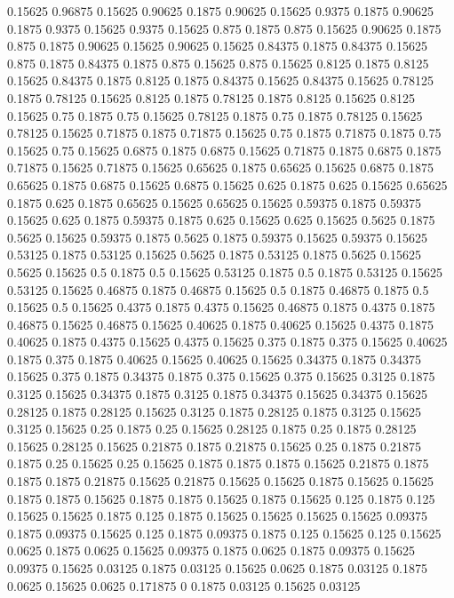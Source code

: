 0.15625 0.96875
0.15625 0.90625
0.1875 0.90625
0.15625 0.9375
0.1875 0.90625
0.1875 0.9375
0.15625 0.9375
0.15625 0.875
0.1875 0.875
0.15625 0.90625
0.1875 0.875
0.1875 0.90625
0.15625 0.90625
0.15625 0.84375
0.1875 0.84375
0.15625 0.875
0.1875 0.84375
0.1875 0.875
0.15625 0.875
0.15625 0.8125
0.1875 0.8125
0.15625 0.84375
0.1875 0.8125
0.1875 0.84375
0.15625 0.84375
0.15625 0.78125
0.1875 0.78125
0.15625 0.8125
0.1875 0.78125
0.1875 0.8125
0.15625 0.8125
0.15625 0.75
0.1875 0.75
0.15625 0.78125
0.1875 0.75
0.1875 0.78125
0.15625 0.78125
0.15625 0.71875
0.1875 0.71875
0.15625 0.75
0.1875 0.71875
0.1875 0.75
0.15625 0.75
0.15625 0.6875
0.1875 0.6875
0.15625 0.71875
0.1875 0.6875
0.1875 0.71875
0.15625 0.71875
0.15625 0.65625
0.1875 0.65625
0.15625 0.6875
0.1875 0.65625
0.1875 0.6875
0.15625 0.6875
0.15625 0.625
0.1875 0.625
0.15625 0.65625
0.1875 0.625
0.1875 0.65625
0.15625 0.65625
0.15625 0.59375
0.1875 0.59375
0.15625 0.625
0.1875 0.59375
0.1875 0.625
0.15625 0.625
0.15625 0.5625
0.1875 0.5625
0.15625 0.59375
0.1875 0.5625
0.1875 0.59375
0.15625 0.59375
0.15625 0.53125
0.1875 0.53125
0.15625 0.5625
0.1875 0.53125
0.1875 0.5625
0.15625 0.5625
0.15625 0.5
0.1875 0.5
0.15625 0.53125
0.1875 0.5
0.1875 0.53125
0.15625 0.53125
0.15625 0.46875
0.1875 0.46875
0.15625 0.5
0.1875 0.46875
0.1875 0.5
0.15625 0.5
0.15625 0.4375
0.1875 0.4375
0.15625 0.46875
0.1875 0.4375
0.1875 0.46875
0.15625 0.46875
0.15625 0.40625
0.1875 0.40625
0.15625 0.4375
0.1875 0.40625
0.1875 0.4375
0.15625 0.4375
0.15625 0.375
0.1875 0.375
0.15625 0.40625
0.1875 0.375
0.1875 0.40625
0.15625 0.40625
0.15625 0.34375
0.1875 0.34375
0.15625 0.375
0.1875 0.34375
0.1875 0.375
0.15625 0.375
0.15625 0.3125
0.1875 0.3125
0.15625 0.34375
0.1875 0.3125
0.1875 0.34375
0.15625 0.34375
0.15625 0.28125
0.1875 0.28125
0.15625 0.3125
0.1875 0.28125
0.1875 0.3125
0.15625 0.3125
0.15625 0.25
0.1875 0.25
0.15625 0.28125
0.1875 0.25
0.1875 0.28125
0.15625 0.28125
0.15625 0.21875
0.1875 0.21875
0.15625 0.25
0.1875 0.21875
0.1875 0.25
0.15625 0.25
0.15625 0.1875
0.1875 0.1875
0.15625 0.21875
0.1875 0.1875
0.1875 0.21875
0.15625 0.21875
0.15625 0.15625
0.1875 0.15625
0.15625 0.1875
0.1875 0.15625
0.1875 0.1875
0.15625 0.1875
0.15625 0.125
0.1875 0.125
0.15625 0.15625
0.1875 0.125
0.1875 0.15625
0.15625 0.15625
0.15625 0.09375
0.1875 0.09375
0.15625 0.125
0.1875 0.09375
0.1875 0.125
0.15625 0.125
0.15625 0.0625
0.1875 0.0625
0.15625 0.09375
0.1875 0.0625
0.1875 0.09375
0.15625 0.09375
0.15625 0.03125
0.1875 0.03125
0.15625 0.0625
0.1875 0.03125
0.1875 0.0625
0.15625 0.0625
0.171875 0
0.1875 0.03125
0.15625 0.03125
